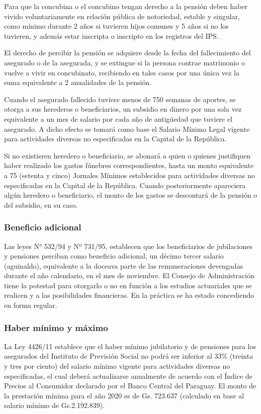 Para que la concubina o el concubino tengan derecho a la pensión deben haber vivido voluntariamente en relación pública de notoriedad, estable y singular, como mínimo durante 2 años si tuvieren hijos comunes y 5 años si no los tuvieren, y además estar inscripta o inscripto en los registros del IPS.  

El derecho de percibir la pensión se adquiere desde la fecha del fallecimiento del asegurado o de la asegurada, y se extingue si la persona contrae matrimonio o vuelve a vivir en concubinato, recibiendo en tales casos por una única vez la suma equivalente a 2 anualidades de la pensión. 

Cuando el asegurado fallecido tuviere menos de 750 semanas de aportes, se otorga a sus herederos o beneficiarios, un subsidio en dinero por una sola vez equivalente a un mes de salario por cada año de antigüedad que tuviere el asegurado. A dicho efecto se tomará como base el Salario Mínimo Legal vigente para actividades diversas no especificadas en la Capital de la República. 

Si no existieren heredero o beneficiario, se abonará a quien o quienes justifiquen haber realizado los gastos fúnebres correspondientes, hasta un monto equivalente a 75 (setenta y cinco) Jornales Mínimos establecidos para actividades diversas no especificadas en la Capital de la República. Cuando posteriormente apareciera algún heredero o beneficiario, el monto de los gastos se descontará de la pensión o del subsidio, en su caso.

\subsubsection{Beneficio adicional}

Las leyes N° 532/94 y Nº 731/95, establecen que los beneficiarios de jubilaciones y pensiones perciban como beneficio adicional, un décimo tercer salario (aguinaldo), equivalente a la doceava parte de las remuneraciones devengadas durante el año calendario, en el mes de noviembre. El Consejo de Administración tiene la potestad para otorgarlo o no en función a los estudios actuariales que se realicen y a las posibilidades financieras. En la práctica se ha estado concediendo en forma regular.

\subsubsection{Haber mínimo y máximo}

La Ley 4426/11 establece que el haber mínimo jubilatorio y de pensiones para los asegurados del Instituto de Previsión Social no podrá ser inferior al 33\% (treinta y tres por ciento) del salario mínimo vigente para actividades diversas no especificadas, el cual deberá actualizarse anualmente de acuerdo con el Índice de Precios al Consumidor declarado por el Banco Central del Paraguay. El monto de la prestación mínima para el año 2020 es de Gs. 723.637 (calculado en base al salario mínimo de Gs.2.192.839). 

